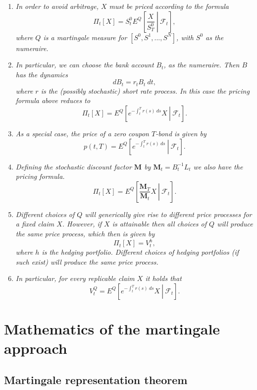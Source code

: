 \documentclass[a4paper,10pt,openany]{book}
\providecommand{\tightlist}{%
 \setlength{\itemsep}{0pt}\setlength{\parskip}{0pt}}
\begin{document}
\begin{enumerate}
\def\labelenumi{\arabic{enumi}.}
\tightlist
\item
  \emph{In order to avoid arbitrage, \(X\) must be priced according to the formula}
  \[
    \Pi_t[X]=S^0_tE^Q\left[\left. \frac{X}{S^0_T}\ \right\vert\ \mathcal{F}_t\right],\tag{11.55}
    \]
  \emph{where \(Q\) is a martingale measure for \([S^0,S^1,...,S^N]\), with \(S^0\) as the numeraire.}
\item
  \emph{In particular, we can choose the bank account \(B_t\), as the numeraire. Then \(B\) has the dynamics}
  \[
    dB_t=r_tB_t\ dt,\tag{11.56}
    \]
  \emph{where \(r\) is the (possibly stochastic) short rate process. In this case the pricing formula above reduces to}
  \[
    \Pi_t[X]=E^Q\left[\left. e^{-\int_t^T r(s)\ ds}X\ \right\vert\ \mathcal{F}_t\right].\tag{11.57}
    \]
\item
  \emph{As a special case, the price of a zero coupon \(T\)-bond is given by}
  \[
    p(t,T)=E^Q\left[\left. e^{-\int_t^T r(s)\ ds}\ \right\vert\ \mathcal{F}_t\right].\tag{11.58}
    \]
\item
  \emph{Defining the stochastic discount factor \(\mathbf{M}\) by \(\mathbf{M}_t=B_t^{-1}L_t\) we also have the pricing formula.}
  \[
    \Pi_t[X]=E^Q\left[\left. \frac{\mathbf{M}_T}{\mathbf{M}_t}X\ \right\vert\ \mathcal{F}_t\right].\tag{11.59}
    \]
\item
  \emph{Different choices of \(Q\) will generically give rise to different price processes for a fixed claim \(X\). However, if \(X\) is attainable then all choices of \(Q\) will produce the same price process, which then is given by}
  \[
    \Pi_t[X]=V_t^h,\tag{11.60}
    \]
  \emph{where \(h\) is the hedging portfolio. Different choices of hedging portfolios (if such exist) will produce the same price process.}
\item
  \emph{In particular, for every replicable claim \(X\) it holds that}
  \[
    V_t^Q=E^Q\left[\left. e^{-\int_t^T r(s)\ ds}X\ \right\vert\ \mathcal{F}_t\right].\tag{11.61}
    \]
\end{enumerate}

\hypertarget{mathematics-of-the-martingale-approach}{%
\section{Mathematics of the martingale approach}\label{mathematics-of-the-martingale-approach}}

\hypertarget{martingale-representation-theorem}{%
\subsection{Martingale representation theorem}\label{martingale-representation-theorem}}
\end{document}
